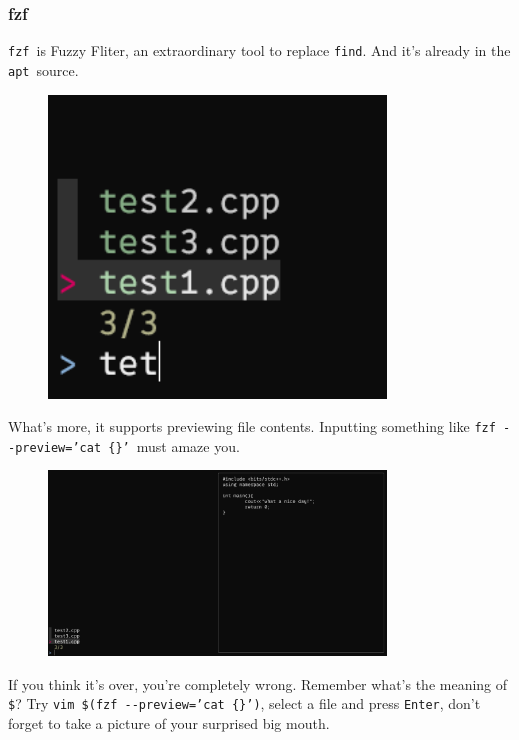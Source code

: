 \documentclass[12pt]{ctexart}
\begin{document}
\subsubsection{\textbf{fzf}}

\texttt{fzf}\ is Fuzzy Fliter, an extraordinary tool to replace
\texttt{find}. And it's already in the \texttt{apt}\
source.

\begin{figure}[H]
    \centering
    \includegraphics[width=0.8\textwidth,keepaspectratio]{assets/Linux/2.6 The way to pretend B/5.png}
\end{figure}

What's more, it supports previewing file contents.
Inputting something like
\texttt{fzf\ -\/-preview='{}cat\ \{\}'{}}\
must amaze you.

\begin{figure}[H]
    \centering
    \includegraphics[width=0.8\textwidth,keepaspectratio]{assets/Linux/2.6 The way to pretend B/6.png}
\end{figure}

If you think it's over, you're
completely wrong. Remember what's the meaning of
\texttt{\$}? Try
\texttt{vim\ \$(fzf\ -\/-preview='{}cat\ \{\}'{})},
select a file and press \texttt{Enter}, don't forget to
take a picture of your surprised big mouth.
\end{document}
